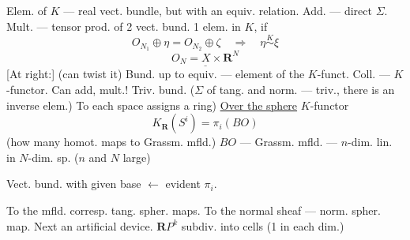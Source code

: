 Elem. of $K$ --- real vect. bundle, but with an equiv. relation.
Add. --- direct $\Sigma$. Mult. --- tensor prod. of 2 vect. bund.
1 elem. in $K$, if
\begin{equation*}
O_{N_1}\oplus\eta=O_{N_2}\oplus\zeta\quad\Longrightarrow\quad\eta\overset K\sim\xi
\end{equation*}
\begin{equation*}
\underline{O_N=X\times\mathbf R^N}
\end{equation*}
[At right:] (can twist it)
Bund. up to equiv. --- element of the $K$-funct.
Coll. --- $K$-functor. Can add, mult.!
Triv. bund. ($\Sigma$ of tang. and norm. --- triv., there is an inverse elem.)
To each space assigns a ring)
\underline{Over the sphere} $K$-functor
\begin{equation*}
K_{\mathbf R}(S^i)=\pi_i(BO)
\end{equation*}
(how many homot. maps to Grassm. mfld.)
$BO$ --- Grassm. mfld. --- $n$-dim. lin. in $N$-dim. sp.
($n$ and $N$ large)
\par\noindent\begin{minipage}{\linewidth}
Vect. bund. with given base $\longleftarrow$ evident $\pi_i$.
\end{minipage}\par
To the mfld. corresp. tang. spher. maps.
To the normal sheaf --- norm. spher. map. Next an artificial device.
$\mathbf RP^k$ subdiv. into cells (1 in each dim.)
